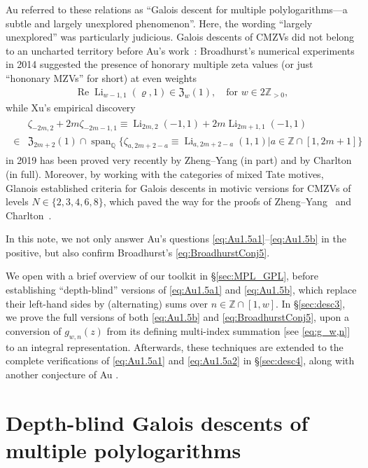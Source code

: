 \documentclass[final,notitlepage,12pt,reqno]{amsart}
\DeclareMathOperator{\Span}{span}
\DeclareMathOperator{\Li}{Li}
\DeclareMathOperator{\R}{Re}
\theoremstyle{plain}
\theoremstyle{definition}
\numberwithin{equation}{section}
\begin{document}
Au referred to these  relations as ``Galois descent for multiple polylogarithms---a subtle and
largely unexplored phenomenon''.
 Here, 
 {the   wording  ``largely unexplored'' was particularly  judicious. Galois descents of CMZVs did not belong to an uncharted territory before Au's work~\cite{Au2022a}: Broadhurst's numerical experiments in 2014 suggested the presence of honorary multiple zeta values  (or just ``hononary MZVs'' for short) at even weights  \cite[Conjecture 5]{Broadhurst2014MDV}\begin{align}
\R \Li_{w-1,1}(\varrho,1)\in\mathfrak Z_w(1),\quad \text{for }w\in 2\mathbb Z_{>0},\label{eq:BroadhurstConj5}
\end{align} while  Xu's empirical discovery  \cite[Conjecture 7.2]{Xu2019nonlinEuler}  \begin{align}\begin{split}&\zeta_{-2m,2}+2m\zeta_{-2m-1,1}\equiv\Li_{2m,2}(-1,1)+2m\Li_{2m+1,1}(-1,1)\\\in{}& \mathfrak Z_{2m+2}(1)\cap\Span_{\mathbb Q}\{\zeta_{a,2m+2-a}\equiv\Li_{a,2m+2-a}(1,1)|a\in\mathbb Z\cap[1,2m+1]\}\label{eq:XuConj}
\end{split}\end{align}  in 2019 has been  proved very recently by Zheng--Yang  \cite{ZhengYang2025}  (in part) and by Charlton  \cite{Charlton2026} (in full). Moreover, by working with the categories of mixed Tate motives, Glanois \cite{Glanois2016} established criteria for Galois descents in motivic versions for CMZVs of levels $N\in\{ 2,3,4,6,8\}$, which paved the way for the proofs of Zheng--Yang~\cite{ZhengYang2025} and  Charlton~\cite{Charlton2026}.}

In this note, we not only answer Au's questions \eqref{eq:Au1.5a1}--\eqref{eq:Au1.5b} in the positive, but also confirm Broadhurst's \eqref{eq:BroadhurstConj5}.

We open with a brief  overview of our  toolkit in  \S\ref{sec:MPL_GPL}, before establishing ``depth-blind'' versions of \eqref{eq:Au1.5a1} and \eqref{eq:Au1.5b}, which replace their left-hand sides by (alternating) sums over $ n\in\mathbb Z\cap[1,w]$.  In \S\ref{sec:desc3}, we prove the full versions of  both \eqref{eq:Au1.5b} and \eqref{eq:BroadhurstConj5},  upon a conversion of $ g_{w,n}(z)$ from its defining multi-index summation [see \eqref{eq:g_w,n}] to an integral representation.
Afterwards, these techniques are extended to the complete verifications of \eqref{eq:Au1.5a1}  and \eqref{eq:Au1.5a2} in \S\ref{sec:desc4}, along with another conjecture of Au \cite[Conjecture 1.6]{Au2022a}. \section{ Depth-blind Galois descents of multiple polylogarithms \label{sec:MPL_GPL}}
\end{document}
